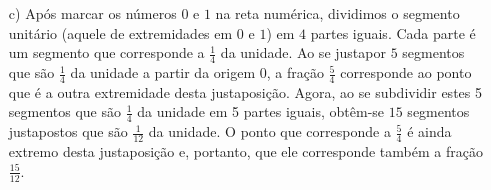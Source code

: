 \begin{enumerate}[a)]

    \item[c)] Após marcar os números       $0$       e       $1$       na reta 
numérica, dividimos o segmento unitário (aquele de extremidades em       $0$     
  e       $1$) em       $4$       partes iguais. Cada parte é um segmento que 
corresponde a       $\frac{1}{4}$       da unidade. Ao se justapor       $5$     
  segmentos que são       $\frac{1}{4}$       da unidade a partir da origem 0, a 
fração       $\frac{5}{4}$       corresponde ao ponto que é a outra extremidade 
desta justaposição. Agora, ao se subdividir estes 5 segmentos que são       
$\frac{1}{4}$       da unidade em 5 partes iguais, obtêm-se       $15$       
segmentos justapostos que são       $\frac{1}{12}$       da unidade. O ponto que 
corresponde a       $\frac{5}{4}$       é ainda extremo desta justaposição e, 
portanto, que ele corresponde também a fração       $\frac{15}{12}$.      



\begin{center}
 

\end{center}
\end{enumerate}
\pagebreak


